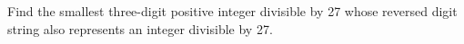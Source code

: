 Find the smallest three-digit positive integer divisible by 27 whose reversed digit string also represents an integer divisible by 27.
